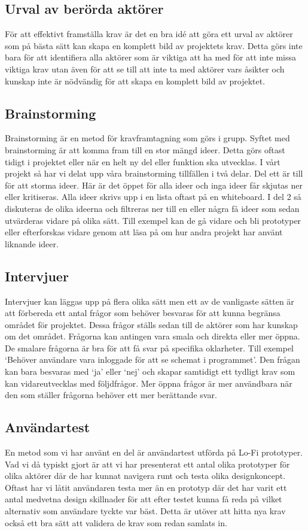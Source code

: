 \subsection{Urval av berörda aktörer}
För att effektivt framställa krav är det en bra idé att göra ett urval av aktörer som på bästa sätt kan skapa en komplett bild av projektets krav. Detta görs inte bara för att identifiera alla aktörer som är viktiga att ha med för att inte missa viktiga krav utan även för att se till att inte ta med aktörer vars åsikter och kunskap inte är nödvändig för att skapa en komplett bild av projektet.


\subsection{Brainstorming}
Brainstorming är en metod för kravframtagning som görs i grupp. Syftet med brainstorming är att komma fram till en stor mängd ideer. Detta görs oftast tidigt i projektet eller när en helt ny del eller funktion ska utvecklas. I vårt projekt så har vi delat upp våra brainstorming tillfällen i två delar. Del ett är till för att storma ideer. Här är det öppet för alla ideer och inga ideer får skjutas ner eller kritiseras. Alla ideer skrivs upp i en lista oftast på en whiteboard. I del 2 så diskuteras de olika ideerna och filtreras ner till en eller några få ideer som sedan utvärderas vidare på olika sätt. Till exempel kan de gå vidare och bli prototyper eller efterforskas vidare genom att läsa på om hur andra projekt har använt liknande ideer. 


\subsection{Intervjuer}
Intervjuer kan läggas upp på flera olika sätt men ett av de vanligaste sätten är att förbereda ett antal frågor som behöver besvaras för att kunna begränsa området för projektet. Dessa frågor ställs sedan till de aktörer som har kunskap om det området. Frågorna kan antingen vara smala och direkta eller mer öppna. De smalare frågorna är bra för att få svar på specifika oklarheter. Till exempel ‘Behöver användare vara inloggade för att se schemat i programmet’. Den frågan kan bara besvaras med ‘ja’ eller ‘nej’ och skapar samtidigt ett tydligt krav som kan vidareutvecklas med följdfrågor. Mer öppna frågor är mer användbara när den som ställer frågorna behöver ett mer berättande svar.

\subsection{Användartest}
En metod som vi har använt en del är användartest utförda på Lo-Fi prototyper. Vad vi då typiskt gjort är att vi har presenterat ett antal olika prototyper för olika aktörer där de har kunnat navigera runt och testa olika designkoncept. Oftast har vi låtit användaren testa mer än en prototyp där det har varit ett antal medvetna design skillnader för att efter testet kunna få reda på vilket alternativ som användare tyckte var bäst. Detta är utöver att hitta nya krav också ett bra sätt att validera de krav som redan samlats in.



